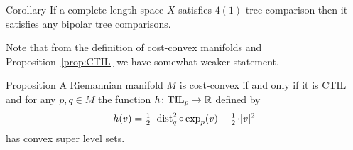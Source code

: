 \begin{thm}{Corollary}\label{cor:4(1)=>n(1)}
If a complete length space $X$ satisfies $4(1)$-tree comparison then it satisfies any bipolar tree comparisons.
\end{thm}

Note that from the definition of cost-convex manifolds and Proposition~\ref{prop:CTIL} we have somewhat weaker statement.

\begin{thm}{Proposition}\label{prop:convexity}
A Riemannian manifold $M$ is cost-convex if and only if it is CTIL and
for any $p,q\in M$ the function $h\colon \mathrm{\rm TIL}_p\to \mathbb{R}$ defined by
\[h(v)=\tfrac12\cdot\dist_q^2\circ\exp_p(v)-\tfrac12\cdot|v|^2\] 
has convex super level sets.
\end{thm}